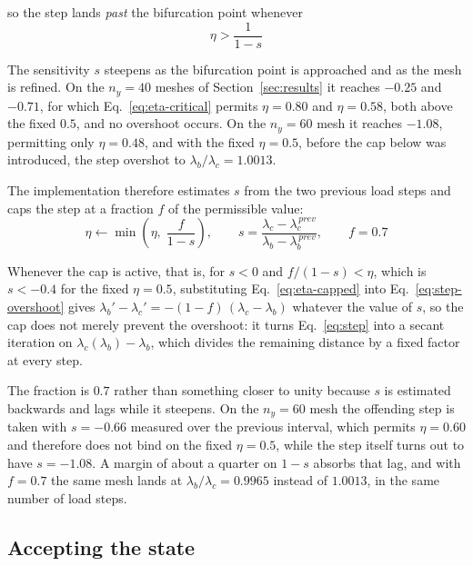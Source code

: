 \documentclass[11pt,a4paper]{article}
\begin{document}
\noindent so the step lands \emph{past} the bifurcation point whenever
\begin{equation}\label{eq:eta-critical}
	\eta > \frac{1}{1-s}
\end{equation}

The sensitivity $s$ steepens as the bifurcation point is approached and as the
mesh is refined.  On the $n_y = 40$ meshes of Section~\ref{sec:results}
it reaches $-0.25$ and $-0.71$, for which Eq.~\ref{eq:eta-critical} permits
$\eta = 0.80$ and $\eta = 0.58$, both above the fixed $0.5$, and no overshoot
occurs.  On the $n_y = 60$ mesh it reaches $-1.08$, permitting only
$\eta = 0.48$, and with the fixed $\eta = 0.5$, before the cap below was
introduced, the step overshot to $\lambda_b/\lambda_c = 1.0013$.

The implementation therefore estimates $s$ from the two previous load steps
and caps the step at a fraction $f$ of the permissible value:
\begin{equation}\label{eq:eta-capped}
	\eta \leftarrow \min\left( \eta,\; \frac{f}{1-s} \right),
	\qquad
	s = \frac{\lambda_c - \lambda_c^{\,prev}}
	         {\lambda_b - \lambda_b^{\,prev}},
	\qquad f = 0.7
\end{equation}

Whenever the cap is active, that is, for $s < 0$ and $f/(1-s) < \eta$, which
is $s < -0.4$ for the fixed $\eta = 0.5$, substituting
Eq.~\ref{eq:eta-capped} into Eq.~\ref{eq:step-overshoot} gives
$\lambda_b' - \lambda_c' = -(1-f)\,(\lambda_c - \lambda_b)$ whatever the value
of $s$, so the cap does not merely prevent the overshoot: it turns
Eq.~\ref{eq:step} into a secant iteration on $\lambda_c(\lambda_b) -
\lambda_b$, which divides the remaining distance by a fixed factor at every
step.

The fraction is $0.7$ rather than something closer to unity because $s$ is
estimated backwards and lags while it steepens.  On the $n_y = 60$ mesh
the offending step is taken with $s = -0.66$ measured over the previous
interval, which permits $\eta = 0.60$ and therefore does not bind on the fixed
$\eta = 0.5$, while the step itself turns out to have $s = -1.08$.  A margin of
about a quarter on $1-s$ absorbs that lag, and with $f = 0.7$ the same mesh
lands at $\lambda_b/\lambda_c = 0.9965$ instead of $1.0013$, in the same number
of load steps.


\subsection{Accepting the state}
\end{document}
